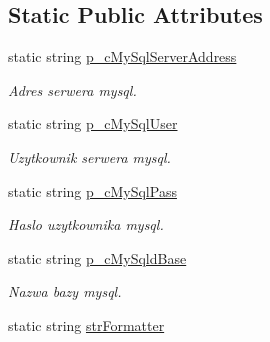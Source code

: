 \subsection*{Static Public Attributes}
\begin{DoxyCompactItemize}
\item 
\hypertarget{classServerConfigs_a25ce60fcec7cc2b3a2d6e527d086e6c3}{
static string \hyperlink{classServerConfigs_a25ce60fcec7cc2b3a2d6e527d086e6c3}{p\_\-cMySqlServerAddress}}
\label{classServerConfigs_a25ce60fcec7cc2b3a2d6e527d086e6c3}

\begin{DoxyCompactList}\small\item\em Adres serwera mysql. \item\end{DoxyCompactList}\item 
\hypertarget{classServerConfigs_ac394f376322427f07ce2de08f3dabdf2}{
static string \hyperlink{classServerConfigs_ac394f376322427f07ce2de08f3dabdf2}{p\_\-cMySqlUser}}
\label{classServerConfigs_ac394f376322427f07ce2de08f3dabdf2}

\begin{DoxyCompactList}\small\item\em Uzytkownik serwera mysql. \item\end{DoxyCompactList}\item 
\hypertarget{classServerConfigs_ac1a3f46a9e789a3e82e5f00e79d459ee}{
static string \hyperlink{classServerConfigs_ac1a3f46a9e789a3e82e5f00e79d459ee}{p\_\-cMySqlPass}}
\label{classServerConfigs_ac1a3f46a9e789a3e82e5f00e79d459ee}

\begin{DoxyCompactList}\small\item\em Haslo uzytkownika mysql. \item\end{DoxyCompactList}\item 
\hypertarget{classServerConfigs_a48a736c392a19e149f14a83dffda0e6a}{
static string \hyperlink{classServerConfigs_a48a736c392a19e149f14a83dffda0e6a}{p\_\-cMySqldBase}}
\label{classServerConfigs_a48a736c392a19e149f14a83dffda0e6a}

\begin{DoxyCompactList}\small\item\em Nazwa bazy mysql. \item\end{DoxyCompactList}\item 
\hypertarget{classServerConfigs_a11c31d078a6bd272d4eca05aba33c0bc}{
static string \hyperlink{classServerConfigs_a11c31d078a6bd272d4eca05aba33c0bc}{strFormatter}}
\label{classServerConfigs_a11c31d078a6bd272d4eca05aba33c0bc}


\end{DoxyCompactItemize}
